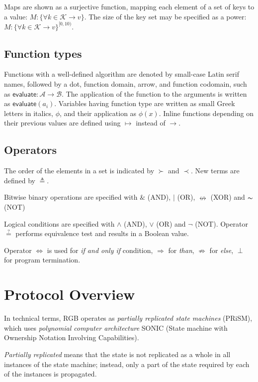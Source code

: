 \documentclass[9pt,oneside]{amsart}
\begin{document}
\begin{multicols}{2}
Maps are shown as a surjective function, mapping each element of a set of keys to a value:
$M: \{ \forall k \in \mathcal{K} \rightarrow v \}$.
The size of the key set may be specified as a power:
$M: \{ \forall k \in \mathcal{K} \rightarrow v \}^{[0, 10)}$.

\subsection{Function types}

Functions with a well-defined algorithm are denoted by small-case Latin serif names,
followed by a dot, function domain, arrow, and function codomain,
such as $\mathsf{evaluate}: \mathcal{A} \rightarrow \mathcal{B}$.
The application of the function to the arguments is written as $\mathsf{evaluate}(a_i)$.
Variables having function type are written as small Greek letters in italics, $\phi$,
and their application as $\phi(x)$.
Inline functions depending on their previous values are defined using
$\mapsto$ instead of $\rightarrow$.

\subsection{Operators}
The order of the elements in a set is indicated by $\succ$ and $\prec$.
New terms are defined by $\triangleq$.

Bitwise binary operations are specified with $\&$ (AND), $|$ (OR),
$\nleftrightarrow$ (XOR) and $\thicksim$ (NOT)

Logical conditions are specified with $\land$ (AND), $\lor$ (OR) and $\lnot$ (NOT).
Operator $\stackrel{?}{=}$ performs equivalence test and results in a Boolean value.

Operator $\Longleftrightarrow$ is used for \emph{if and only if} condition,
$\Rightarrow$ for \emph{than}, $\nRightarrow$ for \emph{else}, $\perp$ for program termination.

\section{Protocol Overview}

In technical terms, RGB operates as \emph{partially replicated state machines} (PRiSM),
which uses \emph{polynomial computer architecture} SONIC
(State machine with Ownership Notation Involving Capabilities).

\emph{Partially replicated} means that the state is not replicated
as a whole in all instances of the state machine;
instead, only a part of the state required by each of the instances is propagated.


\end{multicols}
\end{document}
